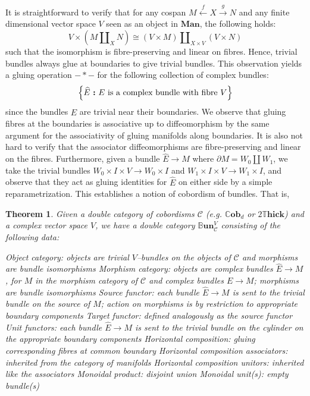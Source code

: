 \documentclass{amsart}
\newcommand{\s}{\mathscr}
\newcommand{\wh}{\widehat}
\renewcommand{\to}[1][]{\stackrel{#1}{\longrightarrow}}
\newcommand{\ot}[1][]{\stackrel{#1}{\longleftarrow}}
\newcommand{\curly}[1]{\left\{ #1 \right\}}
\newcommand{\set}[2][]{\ifthenelse{\equal{#1}{}}
                                  {\curly{#2}}
                                  {\curly{#1\ \textbf{:}\ #2}}}
\newcommand{\CCob}{\mathbb{C}\textbf{ob}}
\newcommand{\Man}{\textbf{Man}}
\newcommand{\DThick}{2\mathbb{T}\mathbf{hick}}
\newcommand{\BBun}{\mathbb{B}\textbf{un}}
\newcommand{\li}[1][]{\ifthenelse{\equal{#1}{}}{\item}{\item \label{#1}}}
\newenvironment{enmrt}{
  \enumerate[(i)]
  \setlength{\itemsep}{0pt}
}{
  \endenumerate
}
\newtheorem{thm}{Theorem}
\numberwithin{thm}{section}
\theoremstyle{definition}
\begin{document}
It is straightforward to verify that for any cospan $M \ot[f] X \to[g] N$ and
any finite dimensional vector space $V$ seen as an object in $\Man$, the
following holds:
\[
  V \times (M \amalg_X N) \cong (V \times M) \amalg_{X \times V} (V \times N)
\]
such that the isomorphism is fibre-preserving and linear on fibres. Hence,
trivial bundles always glue at boundaries to give trivial bundles. This
observation yields a gluing operation $- * -$ for the following collection of
complex bundles:
\[
  \set[\wh{E}]{E \text{ is a complex bundle with fibre } V}
\]
since the bundles $\wh{E}$ are trivial near their boundaries. We observe that
gluing fibres at the boundaries is associative up to diffeomorphism by the same
argument for the associativity of gluing manifolds along boundaries. It is also
not hard to verify that the associator diffeomorphisms are fibre-preserving and
linear on the fibres. Furthermore, given a bundle $\wh{E} \to M$ where
$\partial M = W_0 \amalg W_1$, we take the trivial bundles
$W_0 \times I \times V \to W_0 \times I$ and
$W_1 \times I \times V \to W_1 \times I$, and observe that they act as gluing
identities for $\wh{E}$ on either side by a simple reparametrization. This
establishes a notion of cobordism of bundles. That is,
\begin{thm}
Given a double category of cobordisms $\s{C}$ (e.g. $\CCob_d$ or $\DThick$)
and a complex vector space $V$, we have a double category $\BBun^V_{\s{C}}$
consisting of the following data:
\begin{enmrt}
\li Object category: objects are trivial $V$--bundles on the objects of $\s{C}$
and morphisms are bundle isomorphisms
\li Morphism category: objects are complex bundles $\wh{E} \to M$, for $M$ in
the morphism category of $\s{C}$ and complex bundles $E \to M$; morphisms are
bundle isomorphisms
\li Source functor: each bundle $\wh{E} \to M$ is sent to the trivial bundle on
the source of $M$; action on morphisms is by restriction to appropriate boundary
components
\li Target functor: defined analogously as the source functor
\li Unit functors: each bundle $\wh{E} \to M$ is sent to the trivial bundle on
the cylinder on the appropriate boundary components
\li Horizontal composition: gluing corresponding fibres at common boundary
\li Horizontal composition associators: inherited from the category of manifolds
\li Horizontal composition unitors: inherited like the associators
\li Monoidal product: disjoint union
\li Monoidal unit(s): empty bundle(s)
\end{enmrt}
\end{thm}
\end{document}
